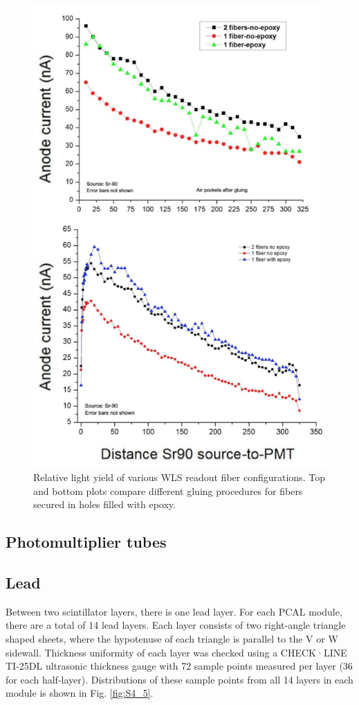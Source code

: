 \begin{figure}[hbt]
\centering
\includegraphics[width=0.85\columnwidth,keepaspectratio]{img/S4_4.png}
\caption{Relative light yield of various WLS readout fiber configurations.  Top and bottom plots compare different gluing procedures for fibers secured in holes filled with epoxy.}
\label{fig:S4_4}
\end{figure}

\subsection{Photomultiplier tubes}

\subsection{Lead}

Between two scintillator layers, there is one lead layer. For each PCAL module, there are a total of 14 lead layers. Each layer consists of two right-angle triangle shaped sheets, where the hypotenuse of each triangle is parallel to the V or W sidewall. Thickness uniformity of each layer was checked using a CHECK·LINE TI-25DL ultrasonic thickness gauge with 72 sample points measured per layer (36 for each half-layer).  Distributions of these sample points from all 14 layers in each module is shown in Fig. \ref{fig:S4_5}.

